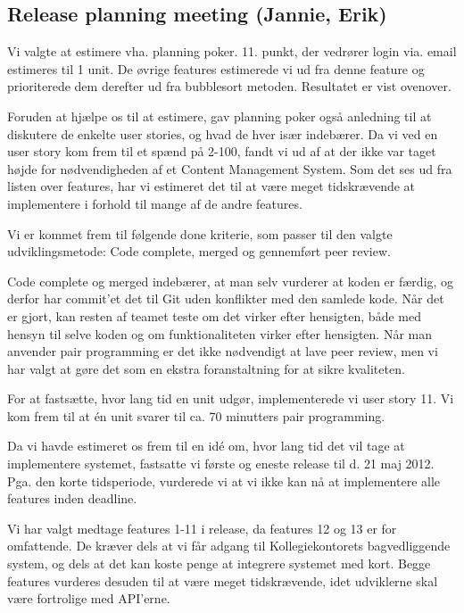 \documentclass[12pt, a4paper]{report}
\begin{document}
\subsection{Release planning meeting (Jannie, Erik)}

Vi valgte at estimere vha. planning poker. 11. punkt, der vedrører login via. email estimeres til 1 unit. De øvrige features estimerede vi ud fra denne feature og prioriterede dem derefter ud fra bubblesort metoden. Resultatet er vist ovenover.

Foruden at hjælpe os til at estimere, gav planning poker også anledning til at diskutere de enkelte user stories, og hvad de hver især indebærer. Da vi ved en user story kom frem til et spænd på 2-100, fandt vi ud af at der ikke var taget højde for nødvendigheden af et Content Management System. Som det ses ud fra listen over features, har vi estimeret det til at være meget tidskrævende at implementere i forhold til mange af de andre features.

Vi er kommet frem til følgende done kriterie, som passer til den valgte udviklingsmetode: Code complete, merged og gennemført peer review.

Code complete og merged indebærer, at man selv vurderer at koden er færdig, og derfor har commit’et det til Git uden konflikter med den samlede kode. Når det er gjort, kan resten af teamet teste om det virker efter hensigten, både med hensyn til selve koden og om funktionaliteten virker efter hensigten. Når man anvender pair programming er det ikke nødvendigt at lave peer review, men vi har valgt at gøre det som en ekstra foranstaltning for at sikre kvaliteten.

For at fastsætte, hvor lang tid en unit udgør, implementerede vi user story 11. Vi kom frem til at én unit svarer til ca. 70 minutters pair programming.

Da vi havde estimeret os frem til en idé om, hvor lang tid det vil tage at implementere systemet, fastsatte vi første og eneste release til d. 21 maj 2012. Pga. den korte tidsperiode, vurderede vi at vi ikke kan nå at implementere alle features inden deadline.

Vi har valgt medtage features 1-11 i release, da features 12 og 13 er for omfattende. De kræver dels at vi får adgang til Kollegiekontorets bagvedliggende system, og dels at det kan koste penge at integrere systemet med kort. Begge features vurderes desuden til at være meget tidskrævende, idet udviklerne skal være fortrolige med API’erne.
\end{document}
